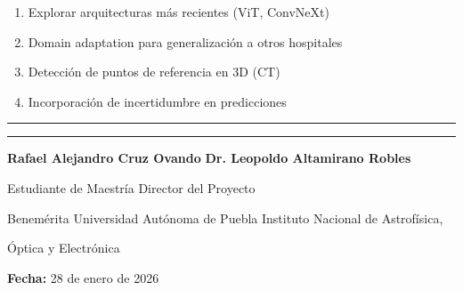 \documentclass[12pt,a4paper]{article}
\begin{document}
\begin{enumerate}
    \item Explorar arquitecturas más recientes (ViT, ConvNeXt)
    \item Domain adaptation para generalización a otros hospitales
    \item Detección de puntos de referencia en 3D (CT)
    \item Incorporación de incertidumbre en predicciones
\end{enumerate}


\vspace{2cm}

\noindent\rule{6cm}{0.4pt} \hfill \rule{6cm}{0.4pt}

\noindent\textbf{Rafael Alejandro Cruz Ovando} \hfill \textbf{Dr. Leopoldo Altamirano Robles}

\noindent Estudiante de Maestría \hfill Director del Proyecto

\noindent Benemérita Universidad Autónoma de Puebla \hfill Instituto Nacional de Astrofísica,

\noindent \hfill Óptica y Electrónica

\vspace{1cm}

\noindent\textbf{Fecha:} 28 de enero de 2026
\end{document}
